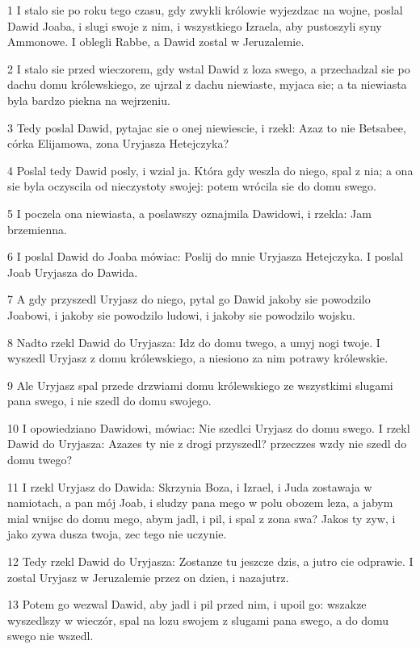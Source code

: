 \par 1 I stalo sie po roku tego czasu, gdy zwykli królowie wyjezdzac na wojne, poslal Dawid Joaba, i slugi swoje z nim, i wszystkiego Izraela, aby pustoszyli syny Ammonowe. I oblegli Rabbe, a Dawid zostal w Jeruzalemie.
\par 2 I stalo sie przed wieczorem, gdy wstal Dawid z loza swego, a przechadzal sie po dachu domu królewskiego, ze ujrzal z dachu niewiaste, myjaca sie; a ta niewiasta byla bardzo piekna na wejrzeniu.
\par 3 Tedy poslal Dawid, pytajac sie o onej niewiescie, i rzekl: Azaz to nie Betsabee, córka Elijamowa, zona Uryjasza Hetejczyka?
\par 4 Poslal tedy Dawid posly, i wzial ja. Która gdy weszla do niego, spal z nia; a ona sie byla oczyscila od nieczystoty swojej: potem wrócila sie do domu swego.
\par 5 I poczela ona niewiasta, a poslawszy oznajmila Dawidowi, i rzekla: Jam brzemienna.
\par 6 I poslal Dawid do Joaba mówiac: Poslij do mnie Uryjasza Hetejczyka. I poslal Joab Uryjasza do Dawida.
\par 7 A gdy przyszedl Uryjasz do niego, pytal go Dawid jakoby sie powodzilo Joabowi, i jakoby sie powodzilo ludowi, i jakoby sie powodzilo wojsku.
\par 8 Nadto rzekl Dawid do Uryjasza: Idz do domu twego, a umyj nogi twoje. I wyszedl Uryjasz z domu królewskiego, a niesiono za nim potrawy królewskie.
\par 9 Ale Uryjasz spal przede drzwiami domu królewskiego ze wszystkimi slugami pana swego, i nie szedl do domu swojego.
\par 10 I opowiedziano Dawidowi, mówiac: Nie szedlci Uryjasz do domu swego. I rzekl Dawid do Uryjasza: Azazes ty nie z drogi przyszedl? przeczzes wzdy nie szedl do domu twego?
\par 11 I rzekl Uryjasz do Dawida: Skrzynia Boza, i Izrael, i Juda zostawaja w namiotach, a pan mój Joab, i sludzy pana mego w polu obozem leza, a jabym mial wnijsc do domu mego, abym jadl, i pil, i spal z zona swa? Jakos ty zyw, i jako zywa dusza twoja, zec tego nie uczynie.
\par 12 Tedy rzekl Dawid do Uryjasza: Zostanze tu jeszcze dzis, a jutro cie odprawie. I zostal Uryjasz w Jeruzalemie przez on dzien, i nazajutrz.
\par 13 Potem go wezwal Dawid, aby jadl i pil przed nim, i upoil go: wszakze wyszedlszy w wieczór, spal na lozu swojem z slugami pana swego, a do domu swego nie wszedl.
